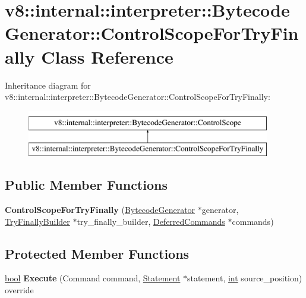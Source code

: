 \hypertarget{classv8_1_1internal_1_1interpreter_1_1BytecodeGenerator_1_1ControlScopeForTryFinally}{}\section{v8\+:\+:internal\+:\+:interpreter\+:\+:Bytecode\+Generator\+:\+:Control\+Scope\+For\+Try\+Finally Class Reference}
\label{classv8_1_1internal_1_1interpreter_1_1BytecodeGenerator_1_1ControlScopeForTryFinally}
Inheritance diagram for v8\+:\+:internal\+:\+:interpreter\+:\+:Bytecode\+Generator\+:\+:Control\+Scope\+For\+Try\+Finally\+:\begin{figure}[H]
\begin{center}
\leavevmode
\includegraphics[height=2.000000cm]{classv8_1_1internal_1_1interpreter_1_1BytecodeGenerator_1_1ControlScopeForTryFinally}
\end{center}
\end{figure}
\subsection*{Public Member Functions}
\begin{DoxyCompactItemize}
\item 
\mbox{\label{classv8_1_1internal_1_1interpreter_1_1BytecodeGenerator_1_1ControlScopeForTryFinally_adc24d88d09c5a3ba5db739c5ea72c5df}} 
{\bfseries Control\+Scope\+For\+Try\+Finally} (\mbox{\hyperlink{classv8_1_1internal_1_1interpreter_1_1BytecodeGenerator}{Bytecode\+Generator}} $\ast$generator, \mbox{\hyperlink{classv8_1_1internal_1_1interpreter_1_1TryFinallyBuilder}{Try\+Finally\+Builder}} $\ast$try\+\_\+finally\+\_\+builder, \mbox{\hyperlink{classv8_1_1internal_1_1interpreter_1_1BytecodeGenerator_1_1ControlScope_1_1DeferredCommands}{Deferred\+Commands}} $\ast$commands)
\end{DoxyCompactItemize}
\subsection*{Protected Member Functions}
\begin{DoxyCompactItemize}
\item 
\mbox{\label{classv8_1_1internal_1_1interpreter_1_1BytecodeGenerator_1_1ControlScopeForTryFinally_af19dddb99db9c6fd9e3efe1be751b8c9}} 
\mbox{\hyperlink{classbool}{bool}} {\bfseries Execute} (Command command, \mbox{\hyperlink{classv8_1_1internal_1_1Statement}{Statement}} $\ast$statement, \mbox{\hyperlink{classint}{int}} source\+\_\+position) override
\end{DoxyCompactItemize}
